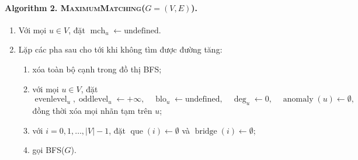\documentclass[11pt]{article}
\begin{document}
\paragraph{Algorithm 2. \textsc{MaximumMatching}(\(G=(V,E)\)).}
\begin{enumerate}
  \item Với mọi \(u\in V\), đặt \(\operatorname{mch}_u\leftarrow
  \mathrm{undefined}\).
  \item Lặp các pha sau cho tới khi không tìm được đường tăng:
  \begin{enumerate}
    \item xóa toàn bộ cạnh trong đồ thị BFS;
    \item với mọi \(u\in V\), đặt
    \[
      \operatorname{evenlevel}_u,\operatorname{oddlevel}_u\leftarrow+\infty,
      \quad
      \operatorname{blo}_u\leftarrow\mathrm{undefined},\quad
      \deg_u\leftarrow0,\quad
      \operatorname{anomaly}(u)\leftarrow\emptyset,
    \]
    đồng thời xóa mọi nhãn tạm trên \(u\);
    \item với \(i=0,1,\ldots,|V|-1\), đặt
    \(\operatorname{que}(i)\leftarrow\emptyset\) và
    \(\operatorname{bridge}(i)\leftarrow\emptyset\);
    \item gọi \textsc{BFS}(\(G\)).
  \end{enumerate}
\end{enumerate}
\end{document}
